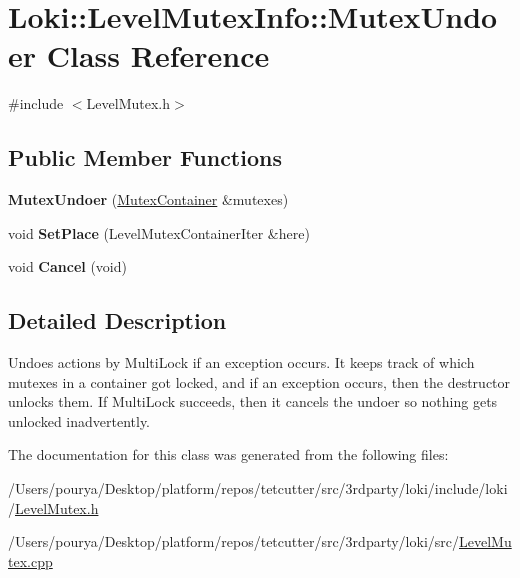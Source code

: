 \hypertarget{classLoki_1_1LevelMutexInfo_1_1MutexUndoer}{}\section{Loki\+:\+:Level\+Mutex\+Info\+:\+:Mutex\+Undoer Class Reference}
\label{classLoki_1_1LevelMutexInfo_1_1MutexUndoer}


{\ttfamily \#include $<$Level\+Mutex.\+h$>$}

\subsection*{Public Member Functions}
\begin{DoxyCompactItemize}
\item 
\hypertarget{classLoki_1_1LevelMutexInfo_1_1MutexUndoer_ae1874886d545529c628055a550413150}{}{\bfseries Mutex\+Undoer} (\hyperlink{classLoki_1_1LevelMutexInfo_a76a0315d91234f5066c75660a9f27a7f}{Mutex\+Container} \&mutexes)\label{classLoki_1_1LevelMutexInfo_1_1MutexUndoer_ae1874886d545529c628055a550413150}

\item 
\hypertarget{classLoki_1_1LevelMutexInfo_1_1MutexUndoer_a61c4b4e18a13559800d73239396ee514}{}void {\bfseries Set\+Place} (Level\+Mutex\+Container\+Iter \&here)\label{classLoki_1_1LevelMutexInfo_1_1MutexUndoer_a61c4b4e18a13559800d73239396ee514}

\item 
\hypertarget{classLoki_1_1LevelMutexInfo_1_1MutexUndoer_aa32b3632b9732b539dd445a48cc9a2a2}{}void {\bfseries Cancel} (void)\label{classLoki_1_1LevelMutexInfo_1_1MutexUndoer_aa32b3632b9732b539dd445a48cc9a2a2}

\end{DoxyCompactItemize}


\subsection{Detailed Description}
Undoes actions by Multi\+Lock if an exception occurs. It keeps track of which mutexes in a container got locked, and if an exception occurs, then the destructor unlocks them. If Multi\+Lock succeeds, then it cancels the undoer so nothing gets unlocked inadvertently. 

The documentation for this class was generated from the following files\+:\begin{DoxyCompactItemize}
\item 
/\+Users/pourya/\+Desktop/platform/repos/tetcutter/src/3rdparty/loki/include/loki/\hyperlink{LevelMutex_8h}{Level\+Mutex.\+h}\item 
/\+Users/pourya/\+Desktop/platform/repos/tetcutter/src/3rdparty/loki/src/\hyperlink{LevelMutex_8cpp}{Level\+Mutex.\+cpp}\end{DoxyCompactItemize}
